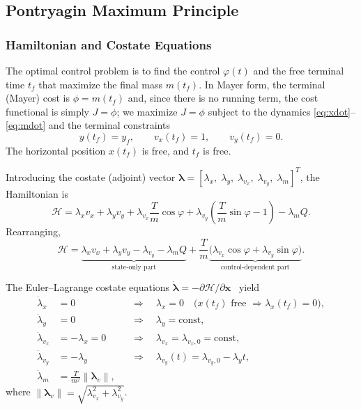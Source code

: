 \documentclass[../main.tex]{subfiles}
\begin{document}
\subsection{Pontryagin Maximum Principle}\label{sec:pmp}

\subsubsection{Hamiltonian and Costate Equations}

The optimal control problem is to find the control $\varphi(t)$ and the free terminal time $t_f$ that maximize the final mass $m(t_f)$. In Mayer form, the terminal (Mayer) cost is $\phi = m(t_f)$ and, since there is no running term, the cost functional is simply $J = \phi$; we maximize $J = \phi$ subject to the dynamics \eqref{eq:xdot}--\eqref{eq:mdot} and the terminal constraints
\begin{equation}
    y(t_f) = y_f, \qquad v_x(t_f) = 1, \qquad v_y(t_f) = 0.
    \label{eq:terminal}
\end{equation}
The horizontal position $x(t_f)$ is free, and $t_f$ is free.

Introducing the costate (adjoint) vector $\boldsymbol{\lambda} = [\lambda_x,\; \lambda_y,\; \lambda_{v_x},\; \lambda_{v_y},\; \lambda_m]^T$, the Hamiltonian is
\begin{equation}
    \mathcal{H} = \lambda_x v_x + \lambda_y v_y
    + \lambda_{v_x}\frac{T}{m}\cos\varphi
    + \lambda_{v_y}\!\left(\frac{T}{m}\sin\varphi - 1\right)
    - \lambda_m Q.
    \label{eq:hamiltonian}
\end{equation}
Rearranging,
\begin{equation}
    \mathcal{H} = \underbrace{\lambda_x v_x + \lambda_y v_y - \lambda_{v_y} - \lambda_m Q}_{\text{state-only part}}
    + \frac{T}{m}\underbrace{\bigl(\lambda_{v_x}\cos\varphi + \lambda_{v_y}\sin\varphi\bigr)}_{\text{control-dependent part}}.
\end{equation}

The Euler--Lagrange costate equations $\dot{\boldsymbol{\lambda}} = -\partial\mathcal{H}/\partial\mathbf{x}$~\cite[Ch.~2]{bryson1975} yield
\begin{align}
    \dot{\lambda}_x     &= 0
        &&\Longrightarrow\quad \lambda_x = 0
        \quad\text{(}x(t_f)\text{ free } \Rightarrow \lambda_x(t_f)=0\text{)},
        \label{eq:lx}\\
    \dot{\lambda}_y     &= 0
        &&\Longrightarrow\quad \lambda_y = \mathrm{const},
        \label{eq:ly}\\
    \dot{\lambda}_{v_x} &= -\lambda_x = 0
        &&\Longrightarrow\quad \lambda_{v_x} = \lambda_{v_x,0} = \mathrm{const},
        \label{eq:lvx}\\
    \dot{\lambda}_{v_y} &= -\lambda_y
        &&\Longrightarrow\quad \lambda_{v_y}(t) = \lambda_{v_y,0} - \lambda_y t,
        \label{eq:lvy}\\
    \dot{\lambda}_m     &= \frac{T}{m^2}\left\|\boldsymbol{\lambda}_v\right\|,
        \label{eq:lm}
\end{align}
where $\|\boldsymbol{\lambda}_v\| = \sqrt{\lambda_{v_x}^2 + \lambda_{v_y}^2}$.
\end{document}
